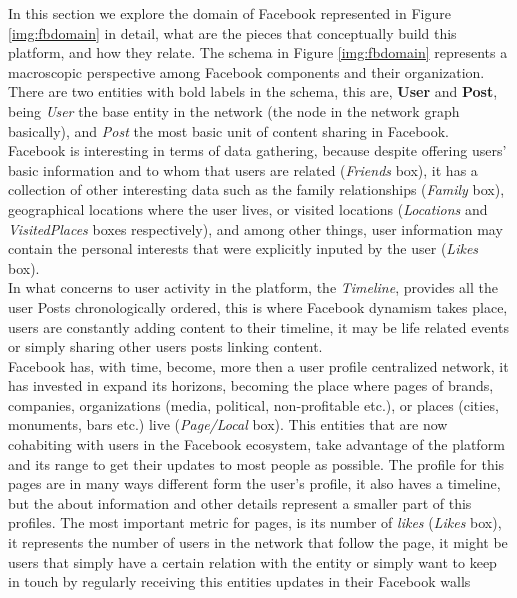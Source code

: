 \indent In this section we explore the domain of Facebook represented in Figure \ref{img:fbdomain} in detail, what are the pieces that conceptually build
this platform, and how they relate. The schema in Figure \ref{img:fbdomain} represents a macroscopic perspective among Facebook components and their organization.\\
\indent There are two entities with bold labels in the schema, this are, \textbf{User} and \textbf{Post}, being
\textit{User} the base entity in the network (the node in the network graph basically), and \textit{Post} the most basic unit of content sharing in Facebook.\\
\indent Facebook is interesting in terms of data gathering, because despite offering users' basic information
and to whom that users are related (\textit{Friends} box), it has a collection of other interesting data
such as the family relationships (\textit{Family} box), geographical locations where the user lives, or
visited locations (\textit{Locations} and \textit{VisitedPlaces} boxes respectively), and among other things, user information
may contain the personal interests that were explicitly inputed by the user (\textit{Likes} box).\\
\indent In what concerns to user activity in the platform, the \textit{Timeline}, provides all the user
Posts chronologically ordered, this is where Facebook dynamism takes place, users are constantly
adding content to their timeline, it may be life related events or simply sharing other users posts linking content.\\
\indent Facebook has, with time, become, more then a user profile centralized network, it has invested in expand its horizons, becoming
the place where pages of brands, companies, organizations (media, political, non-profitable etc.), or places (cities, monuments, bars etc.) live (\textit{Page/Local} box).
This entities that are now cohabiting with users in the Facebook ecosystem, take advantage of the platform and its range to get their updates to most people as possible. The profile
for this pages are in many ways different form the user's profile, it also haves a timeline, but the about information and other details represent a smaller part of this profiles.
The most important metric for pages, is its number of \textit{likes} (\textit{Likes} box), it represents the number of users in the network that follow the page, it might be users
that simply have a certain relation with the entity or simply want to keep in touch by regularly receiving this entities updates in their Facebook walls
